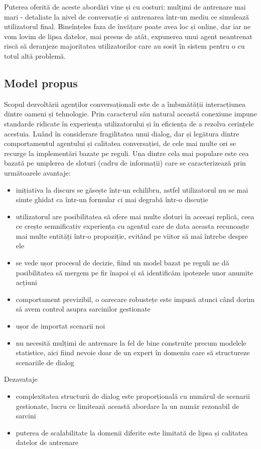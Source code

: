 Puterea oferită de aceste abordări vine și cu costuri: mulțimi de antrenare mai mari - detaliate la nivel de conversație și antrenarea într-un mediu ce simulează utilizatorul final. Bineînțeles faza de învățare poate avea loc și online, dar iar ne vom lovim de lipsa datelor, mai presus de atât, expunerea unui agent neantrenat riscă să deranjeze majoritatea utilizatorilor care au sosit în sistem pentru o cu totul altă problemă.

\subsection{Model propus}

Scopul dezvoltării agenților conversaționali este de a îmbunătății interacțiunea dintre oameni și tehnologie. Prin caracterul său natural această conexiune impune standarde ridicate în experiența utilizatorului și în eficiența de a rezolva cerințele acestuia. Luând în considerare fragilitatea unui dialog, dar și legătura dintre comportamentul agentului și calitatea conversației, de cele mai multe ori se recurge la implementări bazate pe reguli. Una dintre cela mai populare este cea bazată pe umplerea de sloturi (cadru de informații) care se caracterizează prin următoarele avantaje:
\begin{itemize}
	\item inițiativa la discurs se găsește într-un echilibru, astfel utilizatorul nu se mai simte ghidat ca într-un formular ci mai degrabă într-o discuție
	\item utilizatorul are posibilitatea să ofere mai multe sloturi în aceeași replică, ceea ce crește semnificativ experiența cu agentul care de data aceasta recunoaște mai multe entități într-o propoziție, evitând pe viitor să mai întrebe despre ele
	\item se vede ușor procesul de decizie, fiind un model bazat pe reguli ne dă posibilitatea să mergem pe fir înapoi și să identificăm ipotezele unor anumite acțiuni
	\item comportament previzibil, o oarecare robustețe este impusă atunci când dorim să avem control asupra sarcinilor gestionate
	\item ușor de importat scenarii noi
	\item nu necesită mulțimi de antrenare la fel de bine construite precum modelele statistice, aici fiind nevoie doar de un expert în domeniu care să structureze scenariile de dialog
\end{itemize}

Dezavataje
\begin{itemize}
	\item complexitatea structurii de dialog este proporțională cu numărul de scenarii gestionate, lucru ce limitează această abordare la un număr rezonabil de sarcini
	\item puterea de scalabilitate la domenii diferite este limitată de lipsa și calitatea datelor de antrenare
\end{itemize}

